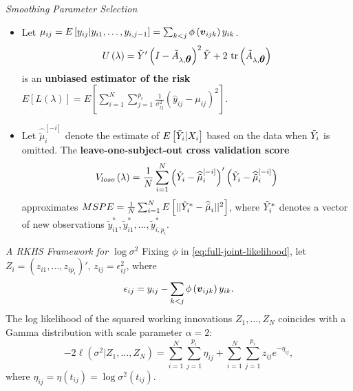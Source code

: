 \begin{frame}{\textit{Smoothing Parameter Selection}}{}\footnotesize
\begin{itemize}
\item Let $\mu_{ij} = E\left[y_{ij}\vert y_{i1}, \dots, y_{i,j-1}\right] = \sum_{k<j} \phi\left(\mbox{\boldmath $v$}_{ijk} \right) y_{ik}$.
	\footnotesize
	\begin{equation*} 
	U\left(\lambda\right) = \tilde{Y}'\left( I - \tilde{A}_{\lambda,\mbox{\boldmath $\theta$}} \right)^2\tilde{Y} + {2}\mbox{ tr}\left(\tilde{A}_{\lambda,\mbox{\boldmath $\theta$}}\right)
	\end{equation*}\footnotesize is an \textbf{unbiased estimator of the risk} $E\left[L\left(\lambda\right)\right] = E\left[\sum_{i = 1}^N \sum_{j = 1}^{p_i} \frac{1}{\sigma^2_{ij}}\left(\hat{y}_{ij} - {\mu}_{ij} \right)^2\right]$.
	\item \footnotesize Let $\widehat{\tilde{\mu}}^{\left[-i\right]}_{i}$ denote the estimate of $E\left[ \tilde{Y}_i \vert X_i \right]$ based on the data when $\tilde{Y}_i$ is omitted. The \textbf{leave-one-subject-out cross validation score}
	\begin{equation*} %
	V_{loso}\left(\lambda\right) = \frac{1}{N}\sum_{i=1}^N \left( \tildeY_i - \widehat{\tilde{\mu}}^{\left[-i\right]}_{i}\right)'\left( \tildeY_i -  \widehat{\tilde{\mu}}^{\left[-i\right]}_{i}\right)
	\end{equation*}
	approximates $MSPE = \frac{1}{N}\sum_{i=1}^N E\left[ \vert \vert \tilde{Y}^*_i - \widehat{\tilde{\mu}}_{i} \vert \vert^2 \right]$, where $\tilde{Y}^*_i$ denotes a vector of new observations $\tilde{y}_{i1}^*, \tilde{y}_{i1}^*, \dots, \tilde{y}_{i, p_i}^*$. 
	\end{itemize}
	\end{frame}



\begin{frame}{\textit{A RKHS Framework for $\log \sigma^2$}}
\footnotesize
Fixing $\phi$ in \eqref{eq:full-joint-likelihood}, let $Z_i = \left(z_{i1}, \dots , z_{ip_i}\right)'$, $z_{ij} = \epsilon_{ij}^2$, where
\[
\epsilon_{ij} =  y_{ij} - \sum_{k<j} \phi\left(\mbox{\boldmath $v$}_{ijk}\right) y_{ik}.
\]
The log likelihood of the squared working innovations $Z_1,\dots, Z_N$ coincides with a Gamma distribution with scale parameter $\alpha = 2$:
\begin{equation*} %
-2\ell\left(  \sigma^2 \vert Z_1,\dots, Z_N \right) =  \sum_{i = 1}^N \sum_{j = 1}^{p_i} \eta_{ij}  + \sum_{i = 1}^N \sum_{j = 1}^{p_i} z_{ij}e^{-\eta_{ij}},
\end{equation*}
\noindent
where $\eta_{ij} = \eta\left(t_{ij}\right) = \log \sigma^2\left(t_{ij}\right)$.
\end{frame}



